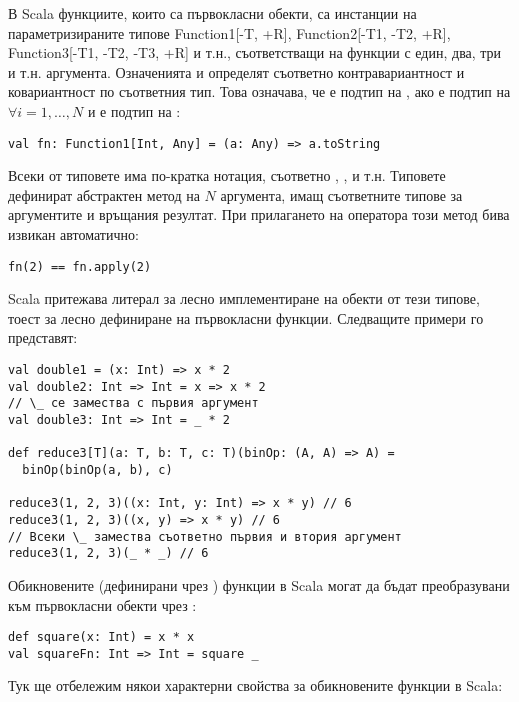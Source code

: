В Scala функциите, които са първокласни обекти, са инстанции на параметризираните типове Function1[-T, +R], Function2[-T1, -T2, +R], Function3[-T1, -T2, -T3, +R] и т.н., съответстващи на функции с един, два, три и т.н. аргумента. Означенията \code{-} и \code{+} определят съответно контравариантност и ковариантност по съответния тип. Това означава, че  е подтип на , ако  е подтип на  $\forall i = 1, \ldots, N$ и  е подтип на :

\begin{lstlisting}
val fn: Function1[Int, Any] = (a: Any) => a.toString
\end{lstlisting}

Всеки от типовете има по-кратка нотация, съответно , ,  и т.н. Типовете дефинират абстрактен метод  на $N$ аргумента, имащ съответните типове за аргументите и връщания резултат. При прилагането на оператора \code{()} този метод бива извикан автоматично:

\begin{lstlisting}
fn(2) == fn.apply(2)
\end{lstlisting}

Scala притежава литерал за лесно имплементиране на обекти от тези типове, тоест за лесно дефиниране на първокласни функции. Следващите примери го представят:

\begin{lstlisting}[texcl=true]
val double1 = (x: Int) => x * 2
val double2: Int => Int = x => x * 2
// \_ се замества с първия аргумент
val double3: Int => Int = _ * 2

def reduce3[T](a: T, b: T, c: T)(binOp: (A, A) => A) =
  binOp(binOp(a, b), c)

reduce3(1, 2, 3)((x: Int, y: Int) => x * y) // 6
reduce3(1, 2, 3)((x, y) => x * y) // 6
// Всеки \_ замества съответно първия и втория аргумент
reduce3(1, 2, 3)(_ * _) // 6
\end{lstlisting}

Обикновените (дефинирани чрез ) функции в Scala могат да бъдат преобразувани към първокласни обекти чрез \code{_}:

\begin{lstlisting}
def square(x: Int) = x * x
val squareFn: Int => Int = square _
\end{lstlisting}

Тук ще отбележим някои характерни свойства за обикновените функции в Scala:

